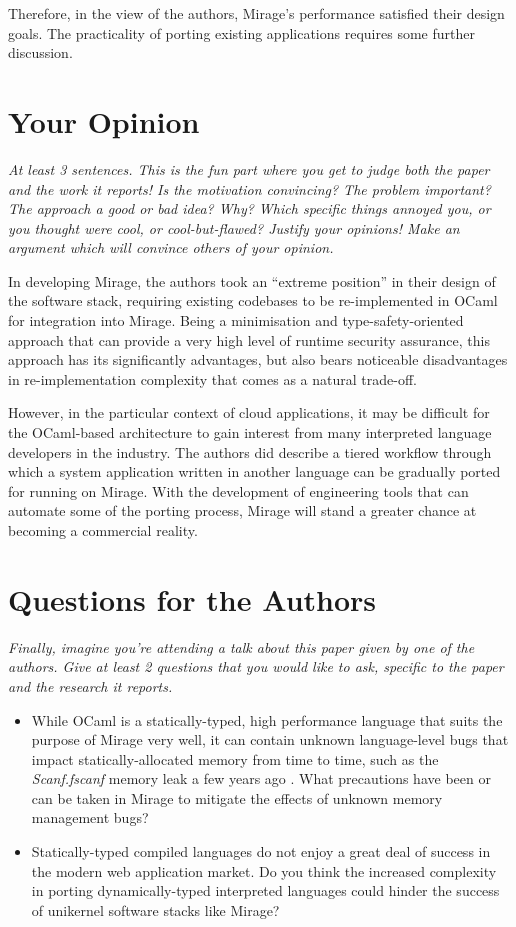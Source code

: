 \documentclass[11pt]{article}
\begin{document}
Therefore, in the view of the authors, Mirage's performance satisfied their design goals. The practicality of porting existing applications requires some further discussion. 

\section*{Your Opinion}
\textsl{At least 3 sentences. This is the fun part where you get to judge both the paper and the work it reports! Is the motivation convincing? The problem important? The approach a good or bad idea?  Why? Which specific things annoyed you, or you thought were cool, or cool-but-flawed? Justify your opinions! Make an argument which will convince others of your opinion.}

In developing Mirage, the authors took an ``extreme position'' in their design of the software stack, requiring existing codebases to be re-implemented in OCaml for integration into Mirage. Being a minimisation and type-safety-oriented approach that can provide a very high level of runtime security assurance, this approach has its significantly advantages, but also bears noticeable disadvantages in re-implementation complexity that comes as a natural trade-off. 

However, in the particular context of cloud applications, it may be difficult for the OCaml-based architecture to gain interest from many interpreted language developers in the industry. The authors did describe a tiered workflow through which a system application written in another language can be gradually ported for running on Mirage. With the development of engineering tools that can automate some of the porting process, Mirage will stand a greater chance at becoming a commercial reality.

\section*{Questions for the Authors}
\textsl{Finally, imagine you're attending a talk about this paper given by one of the authors. Give at least 2 questions that you would like to ask, specific to the paper and the research it reports.}


\begin{itemize}
	\item While OCaml is a statically-typed, high performance language that suits the purpose of Mirage very well, it can contain unknown language-level bugs that impact statically-allocated memory from time to time, such as the \emph{Scanf.fscanf} memory leak a few years ago \cite{ocamlmemoryleak}. What precautions have been or can be taken in Mirage to mitigate the effects of unknown memory management bugs?
	\item Statically-typed compiled languages do not enjoy a great deal of success in the modern web application market. Do you think the increased complexity in porting dynamically-typed interpreted languages could hinder the success of unikernel software stacks like Mirage?
\end{itemize}


\footnotesize{}
\end{document}
